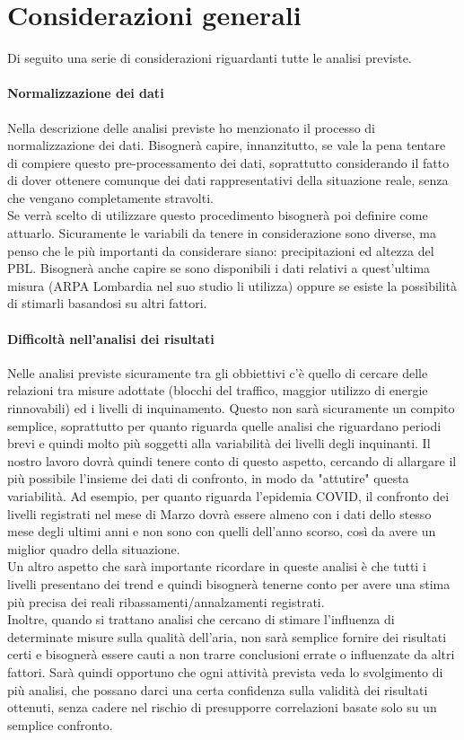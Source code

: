 \documentclass{article}
\begin{document}
\section{Considerazioni generali}
Di seguito una serie di considerazioni riguardanti tutte le analisi previste.
\paragraph{Normalizzazione dei dati}
Nella descrizione delle analisi previste ho menzionato il processo di normalizzazione dei dati. Bisognerà capire, innanzitutto, se vale la pena tentare di compiere questo pre-processamento dei dati, soprattutto considerando il fatto di dover ottenere comunque dei dati rappresentativi della situazione reale, senza che vengano completamente stravolti. 
\\Se verrà scelto di utilizzare questo procedimento bisognerà poi definire come attuarlo. Sicuramente le variabili da tenere in considerazione sono diverse, ma penso che le più importanti da considerare siano: precipitazioni ed altezza del PBL. Bisognerà anche capire se sono disponibili i dati relativi a quest'ultima misura (ARPA Lombardia nel suo studio li utilizza) oppure se esiste la possibilità di stimarli basandosi su altri fattori.
\paragraph{Difficoltà nell'analisi dei risultati}
Nelle analisi previste sicuramente tra gli obbiettivi c'è quello di cercare delle relazioni tra misure adottate (blocchi del traffico, maggior utilizzo di energie rinnovabili) ed i livelli di inquinamento. Questo non sarà sicuramente un compito semplice, soprattutto per quanto riguarda quelle analisi che riguardano periodi brevi e quindi molto più soggetti alla variabilità dei livelli degli inquinanti. Il nostro lavoro dovrà quindi tenere conto di questo aspetto, cercando di allargare il più possibile l'insieme dei dati di confronto, in modo da "attutire" questa variabilità. Ad esempio, per quanto riguarda l'epidemia COVID, il confronto dei livelli registrati nel mese di Marzo dovrà essere almeno con i dati dello stesso mese degli ultimi anni e non sono con quelli dell'anno scorso, così da avere un miglior quadro della situazione.
\\Un altro aspetto che sarà importante ricordare in queste analisi è che tutti i livelli presentano dei trend e quindi bisognerà tenerne conto per avere una stima più precisa dei reali ribassamenti/annalzamenti registrati.
\\Inoltre, quando si trattano analisi che cercano di stimare l'influenza di determinate misure sulla qualità dell'aria, non sarà semplice fornire dei risultati certi e bisognerà essere cauti a non trarre conclusioni errate o influenzate da altri fattori. Sarà quindi opportuno che ogni attività prevista veda lo svolgimento di più analisi, che possano darci una certa confidenza sulla validità dei risultati ottenuti, senza cadere nel rischio di presupporre correlazioni basate solo su un semplice confronto.
\end{document}
